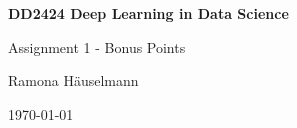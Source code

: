 \begin{titlepage}
\begin{center}
	\vspace{3em}	
    {\Huge\bfseries DD2424 Deep Learning in Data Science\par}
    \vspace{2em}
    {\huge Assignment 1 - Bonus Points \par}
    \vspace{3em}
    {\Large Ramona Häuselmann\par}
	\vspace{1em}
    \today
\end{center}
\end{titlepage}